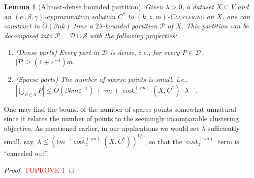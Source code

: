 \documentclass[letterpaper,11pt]{article}
\theoremstyle{plain}
\newtheorem{lemma}[theorem]{Lemma}
\theoremstyle{definition}
\theoremstyle{remark}
\DeclareMathOperator{\cost}{cost}
\newcommand{\eps}{\varepsilon}
\newcommand{\calD}{\mathcal{D}}
\newcommand{\calP}{\mathcal{P}}
\newcommand{\calS}{\mathcal{S}}
\newcommand{\ProblemName}[1]{\textsc{#1}}
\newcommand{\kzmC}{\ProblemName{$(k,z,m)$-Clustering}\xspace}
\begin{document}
\begin{lemma}[Almost-dense bounded partition]
    \label{lem:decomposition}
Given $\lambda>0$, a dataset $X \subseteq V$ and an $(\alpha,\beta,\gamma)$-approximation solution $C^*$ to \kzmC on $X$, one can construct in $\tilde O(\beta n k)$ time a $2\lambda$-bounded partition $\calP$ of $X$. This partition can be decomposed into $\calP = \calD \cup \calS$ with the following properties:
    \begin{enumerate}
        \item  (Dense parts) Every part in $\calD$ is dense, i.e., for every $P\in\calD$, $|P|\ge (1+\eps^{-1})m$.
        \item  (Sparse parts) The number of sparse points is small, i.e., $|\bigcup_{P\in\calS} P|\le O(\beta k m\eps^{-1}) + \gamma m + \cost_z^{(\gamma m)}(X,C^*)\cdot \lambda^{-z}$. 
    \end{enumerate}

\end{lemma}


One may find the bound of the number of sparse points somewhat unnatural since it relates the number of points to the seemingly incomparable clustering objective. As mentioned earlier, in our applications we would set $\lambda$ sufficiently small, say, $\lambda \le \left((m^{-1}\cost_z^{(\gamma m)}(X,C^*)\right)^{1/z}$, so that the $\cost_z^{(\gamma m)}$ term is ``canceled out''.





\begin{proof}\textcolor{red}{TOPROVE 1}\end{proof}
\end{document}
